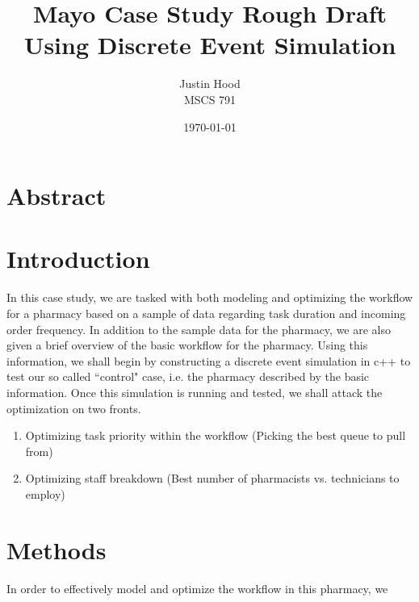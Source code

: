 \documentclass[11pt]{report}            %
\title{\bf Mayo Case Study Rough Draft\\
\large Using Discrete Event Simulation}  %
\author{Justin Hood\\
MSCS 791}              %
\date{\today}                           %
\begin{document}
\maketitle                              %
\setcounter{page}{2}                    %
\tableofcontents                        %
\newpage
\section*{Abstract}

\section*{Introduction}                %
In this case study, we are tasked with both modeling and optimizing the workflow for a pharmacy based on a sample of data regarding task duration and incoming order frequency. In addition to the sample data for the pharmacy, we are also given a brief overview of the basic workflow for the pharmacy. Using this information, we shall begin by constructing a discrete event simulation in c++ to test our so called ``control" case, i.e. the pharmacy described by the basic information. Once this simulation is running and tested, we shall attack the optimization on two fronts.
\begin{enumerate}
\item Optimizing task priority within the workflow (Picking the best queue to pull from)
\item Optimizing staff breakdown (Best number of pharmacists vs. technicians to employ)
\end{enumerate}
\section*{Methods}
In order to effectively model and optimize the workflow in this pharmacy, we 
\end{document}
